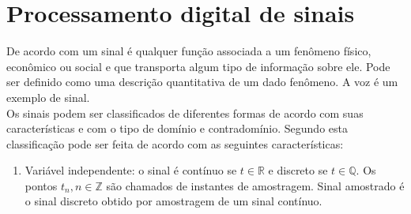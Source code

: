 \section{Processamento digital de sinais}
 
De acordo com \cite{sig} um sinal é qualquer função associada a um fenômeno físico, econômico ou social e que transporta  algum tipo de informação sobre ele. Pode ser definido como uma descrição quantitativa de um dado fenômeno. A voz é um exemplo de sinal.\\ Os sinais podem ser classificados de diferentes formas de acordo com suas características  e com o tipo de domínio e contradomínio. Segundo \cite{sig} esta classificação pode ser feita de acordo com as seguintes características:
\begin{enumerate}
\item Variável independente: o sinal é contínuo se $t \in \mathbb{R}$ e discreto se $t \in \mathbb{Q}$. Os pontos $t_n, n \in \mathbb{Z}$ são chamados de instantes de amostragem. Sinal amostrado é o sinal discreto obtido por amostragem de um sinal contínuo.


\end{enumerate}

